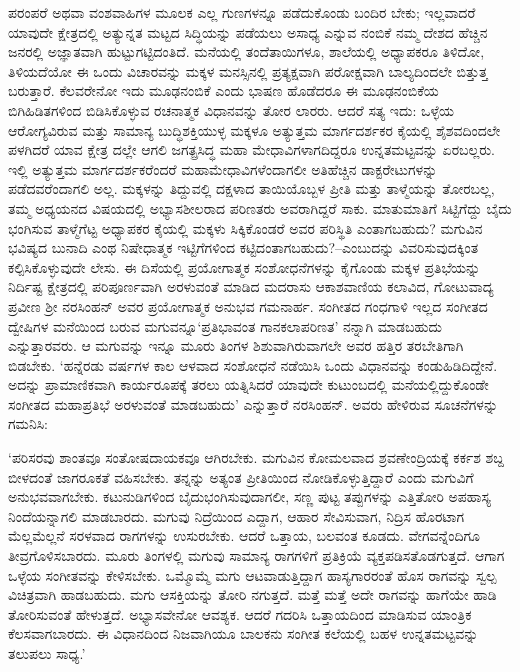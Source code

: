 
ಪರಂಪರೆ ಅಥವಾ ವಂಶವಾಹಿಗಳ ಮೂಲಕ ಎಲ್ಲ ಗುಣಗಳನ್ನೂ ಪಡೆದುಕೊಂಡು ಬಂದಿರ ಬೇಕು; ಇಲ್ಲವಾದರೆ ಯಾವುದೇ ಕ್ಷೇತ್ರದಲ್ಲಿ ಅತ್ಯುನ್ನತ ಮಟ್ಟದ ಸಿದ್ಧಿಯನ್ನು ಪಡೆಯಲು ಅಸಾಧ್ಯ ಎನ್ನುವ ನಂಬಿಕೆ ನಮ್ಮ ದೇಶದ ಹೆಚ್ಚಿನ ಜನರಲ್ಲಿ ಅಜ್ಞಾತವಾಗಿ ಹುಟ್ಟುಗಟ್ಟಿದಂತಿದೆ. ಮನೆಯಲ್ಲಿ ತಂದೆತಾಯಿಗಳೂ, ಶಾಲೆಯಲ್ಲಿ ಅಧ್ಯಾಪಕರೂ ತಿಳಿದೋ, ತಿಳಿಯದೆಯೋ ಈ ಒಂದು ವಿಚಾರವನ್ನು ಮಕ್ಕಳ ಮನಸ್ಸಿನಲ್ಲಿ ಪ್ರತ್ಯಕ್ಷವಾಗಿ ಪರೋಕ್ಷವಾಗಿ ಬಾಲ್ಯದಿಂದಲೇ ಬಿತ್ತುತ್ತ ಬರುತ್ತಾರೆ. ಕೆಲವರೇನೋ ಇದು ಮೂಢನಂಬಿಕೆ ಎಂದು ಭಾಷಣ ಹೊಡೆದರೂ ಈ ಮೂಢನಂಬಿಕೆಯ ಬಿಗಿಹಿಡಿತಗಳಿಂದ ಬಿಡಿಸಿಕೊಳ್ಳುವ ರಚನಾತ್ಮಕ ವಿಧಾನವನ್ನು ತೋರ ಲಾರರು. ಆದರೆ ಸತ್ಯ ಇದು: ಒಳ್ಳೆಯ ಆರೋಗ್ಯವಿರುವ ಮತ್ತು ಸಾಮಾನ್ಯ ಬುದ್ಧಿಶಕ್ತಿಯುಳ್ಳ ಮಕ್ಕಳೂ ಅತ್ಯುತ್ತಮ ಮಾರ್ಗ\-ದರ್ಶಕರ ಕೈಯಲ್ಲಿ ಶೈಶವದಿಂದಲೇ ಪಳಗಿದರೆ ಯಾವ ಕ್ಷೇತ್ರ ದಲ್ಲೇ ಆಗಲಿ ಜಗತ್ಪ್ರಸಿದ್ಧ ಮಹಾ ಮೇಧಾವಿಗಳಾಗದಿದ್ದರೂ ಉನ್ನತಮಟ್ಟವನ್ನು ಏರಬಲ್ಲರು. ಇಲ್ಲಿ ಅತ್ಯುತ್ತಮ ಮಾರ್ಗದರ್ಶಕ\-ರೆಂದರೆ ಮಹಾಮೇಧಾವಿಗಳೆಂದಾಗಲೀ ಅತಿಹೆಚ್ಚಿನ ಡಾಕ್ಟರೇಟುಗಳನ್ನು ಪಡೆದವರೆಂದಾಗಲಿ ಅಲ್ಲ. ಮಕ್ಕಳನ್ನು ತಿದ್ದುವಲ್ಲಿ ದಕ್ಷಳಾದ ತಾಯಿಯೊಬ್ಬಳ ಪ್ರೀತಿ ಮತ್ತು ತಾಳ್ಮೆಯನ್ನು ತೋರಬಲ್ಲ, ತಮ್ಮ ಅಧ್ಯಯನದ ವಿಷಯದಲ್ಲಿ ಅಭ್ಯಾಸಶೀಲರಾದ ಪರಿಣತರು ಅವರಾಗಿದ್ದರೆ ಸಾಕು. ಮಾತುಮಾತಿಗೆ ಸಿಟ್ಟಿಗೆದ್ದು ಬೈದು ಭಂಗಿಸುವ ತಾಳ್ಮೆಗೆಟ್ಟ ಅಧ್ಯಾಪಕರ ಕೈಯಲ್ಲಿ ಮಕ್ಕಳು ಸಿಕ್ಕಿಕೊಂಡರೆ ಅವರ ಪರಿಸ್ಥಿತಿ ಎಂತಾಗಬಹುದು? ಮಗುವಿನ ಭವಿಷ್ಯದ ಬುನಾದಿ ಎಂಥ ನಿಷೇಧಾತ್ಮಕ ಇಟ್ಟಿಗೆಗಳಿಂದ ಕಟ್ಟಿದಂತಾಗಬಹುದು?–ಎಂಬುದನ್ನು ವಿವರಿಸುವುದಕ್ಕಿಂತ ಕಲ್ಪಿಸಿಕೊಳ್ಳುವುದೇ ಲೇಸು. ಈ ದಿಸೆಯಲ್ಲಿ ಪ್ರಯೋಗಾತ್ಮಕ ಸಂಶೋಧನೆಗಳನ್ನು ಕೈಗೊಂಡು ಮಕ್ಕಳ ಪ್ರತಿಭೆಯನ್ನು ನಿರ್ದಿಷ್ಟ ಕ್ಷೇತ್ರದಲ್ಲಿ ಪರಿಪೂರ್ಣವಾಗಿ ಅರಳುವಂತೆ ಮಾಡಿದ ಮದರಾಸು ಆಕಾಶವಾಣಿಯ ಕಲಾವಿದ, ಗೋಟುವಾದ್ಯ ಪ್ರವೀಣ ಶ‍್ರೀ ನರಸಿಂಹನ್ ಅವರ ಪ್ರಯೋಗಾತ್ಮಕ ಅನುಭವ ಗಮನಾರ್ಹ. ಸಂಗೀತದ ಗಂಧಗಾಳಿ ಇಲ್ಲದ ಸಂಗೀತದ ದ್ವೇಷಿಗಳ ಮನೆಯಿಂದ ಬರುವ ಮಗುವನ್ನೂ\break ‘ಪ್ರತಿಭಾವಂತ ಗಾನಕಲಾಪರಿಣತ’ ನನ್ನಾಗಿ ಮಾಡಬಹುದು ಎನ್ನುತ್ತಾರವರು. ಆ ಮಗುವನ್ನು ಇನ್ನೂ ಮೂರು ತಿಂಗಳ ಶಿಶುವಾಗಿರುವಾಗಲೇ ಅವರ ಹತ್ತಿರ ತರಬೇತಿಗಾಗಿ ಬಿಡಬೇಕು. ‘ಹನ್ನೆರಡು ವರ್ಷಗಳ ಕಾಲ ಆಳವಾದ ಸಂಶೋಧನೆ ನಡೆಯಿಸಿ ಒಂದು ವಿಧಾನವನ್ನು ಕಂಡುಹಿಡಿದಿದ್ದೇನೆ. ಅದನ್ನು ಪ್ರಾಮಾಣಿಕವಾಗಿ ಕಾರ್ಯರೂಪಕ್ಕೆ ತರಲು ಯತ್ನಿಸಿದರೆ ಯಾವುದೇ ಕುಟುಂಬದಲ್ಲಿ ಮನೆಯಲ್ಲಿದ್ದುಕೊಂಡೇ ಸಂಗೀತದ ಮಹಾಪ್ರತಿಭೆ ಅರಳುವಂತೆ ಮಾಡಬಹುದು’ ಎನ್ನುತ್ತಾರೆ ನರಸಿಂಹನ್. ಅವರು ಹೇಳಿರುವ ಸೂಚನೆಗಳನ್ನು ಗಮನಿಸಿ:

‘ಪರಿಸರವು ಶಾಂತವೂ ಸಂತೋಷದಾಯಕವೂ ಆಗಿರಬೇಕು. ಮಗುವಿನ ಕೋಮಲವಾದ ಶ್ರವಣೇಂದ್ರಿಯಕ್ಕೆ ಕರ್ಕಶ ಶಬ್ದ ಬೀಳದಂತೆ ಜಾಗರೂಕತೆ ವಹಿಸಬೇಕು. ತನ್ನನ್ನು ಅತ್ಯಂತ ಪ್ರೀತಿಯಿಂದ ನೋಡಿಕೊಳ್ಳುತ್ತಿದ್ದಾರೆ ಎಂದು ಮಗುವಿಗೆ ಅನುಭವವಾಗಬೇಕು. ಕಟುನುಡಿಗಳಿಂದ ಬೈದುಭಂಗಿಸುವುದಾಗಲೀ, ಸಣ್ಣ ಪುಟ್ಟ ತಪ್ಪುಗಳನ್ನು ಎತ್ತಿತೋರಿ ಅಪಹಾಸ್ಯ ನಿಂದೆಯನ್ನಾಗಲಿ ಮಾಡಬಾರದು. ಮಗುವು ನಿದ್ರೆಯಿಂದ ಎದ್ದಾಗ, ಆಹಾರ ಸೇವಿಸುವಾಗ, ನಿದ್ರಿಸ ಹೊರಟಾಗ ಮೆಲ್ಲಮೆಲ್ಲನೆ ಸರಳವಾದ ರಾಗಗಳನ್ನು ಉಸುರಬೇಕು. ಆದರೆ ಒತ್ತಾಯ, ಬಲವಂತ ಕೂಡದು. ವೇಗವನ್ನೆಂದಿಗೂ ತೀವ್ರಗೊಳಿಸಬಾರದು. ಮೂರು ತಿಂಗಳಲ್ಲಿ ಮಗುವು ಸಾಮಾನ್ಯ ರಾಗಗಳಿಗೆ ಪ್ರತಿಕ್ರಿಯೆ ವ್ಯಕ್ತಪಡಿಸತೊಡಗುತ್ತದೆ. ಆಗಾಗ ಒಳ್ಳೆಯ ಸಂಗೀತವನ್ನು ಕೇಳಿಸಬೇಕು. ಒಮ್ಮೊಮ್ಮೆ ಮಗು ಆಟವಾಡುತ್ತಿದ್ದಾಗ ಹಾಸ್ಯಗಾರರಂತೆ ಹೊಸ ರಾಗವನ್ನು ಸ್ವಲ್ಪ ವಿಚಿತ್ರವಾಗಿ ಹಾಡಬಹುದು. ಮಗು ಆಸಕ್ತಿಯನ್ನು ತೋರಿ ನಗುತ್ತದೆ. ಮತ್ತೆ ಮತ್ತೆ ಅದೇ ರಾಗವನ್ನು ಹಾಗೆಯೇ ಹಾಡಿ ತೋರಿಸುವಂತೆ ಹೇಳುತ್ತದೆ. ಅಭ್ಯಾಸವೇನೋ ಆವಶ್ಯಕ. ಆದರೆ ಗದರಿಸಿ ಒತ್ತಾಯದಿಂದ ಮಾಡಿಸುವ ಯಾಂತ್ರಿಕ ಕೆಲಸವಾಗಬಾರದು. ಈ ವಿಧಾನದಿಂದ ನಿಜವಾಗಿಯೂ ಬಾಲಕನು ಸಂಗೀತ ಕಲೆಯಲ್ಲಿ ಬಹಳ ಉನ್ನತಮಟ್ಟವನ್ನು ತಲುಪಲು ಸಾಧ್ಯ.’

